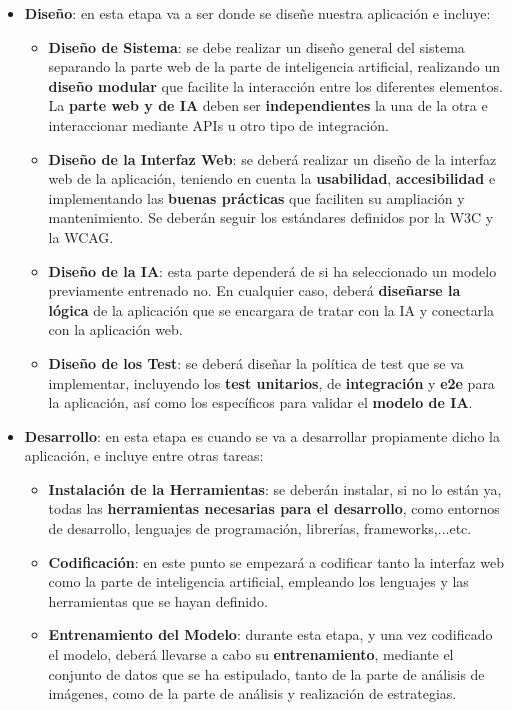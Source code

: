 \begin{itemize}
	\item \textbf{Diseño}: en esta etapa va a ser donde se diseñe nuestra aplicación e incluye:
	\begin{itemize}
		\item  \textbf{Diseño de Sistema}: se debe realizar un diseño general del sistema separando la parte web de la parte de inteligencia artificial, realizando un \textbf{diseño modular} que facilite la interacción entre los diferentes elementos. La \textbf{parte web y de IA} deben ser \textbf{independientes} la una de la otra e interaccionar mediante APIs u otro tipo de integración.
		\item \textbf{Diseño de la Interfaz Web}: se deberá realizar un diseño de la interfaz web de la aplicación, teniendo en cuenta la \textbf{\textbf{usabilidad}}, \textbf{accesibilidad} e implementando las \textbf{\textbf{buenas prácticas}} que faciliten su ampliación y mantenimiento. Se deberán seguir los estándares definidos por la W3C y la WCAG. 
		\item \textbf{Diseño de la IA}: esta parte dependerá de si ha seleccionado un modelo previamente entrenado no. En cualquier caso, deberá \textbf{diseñarse la lógica} de la aplicación que se encargara de tratar con la IA y conectarla con la aplicación web.
		\item \textbf{Diseño de los Test}: se deberá diseñar la política de test que se va implementar, incluyendo los \textbf{test unitarios}, de \textbf{integración} y \textbf{e2e} para la aplicación, así como los específicos para validar el \textbf{modelo de IA}.
	\end{itemize}
	
	\item \textbf{Desarrollo}: en esta etapa es cuando se va a desarrollar propiamente dicho la aplicación, e incluye entre otras tareas:
	\begin{itemize}
		\item \textbf{Instalación de la Herramientas}: se deberán instalar, si no lo están ya, todas las \textbf{herramientas necesarias para el desarrollo}, como entornos de desarrollo, lenguajes de programación, librerías, frameworks,...etc.
		\item \textbf{Codificación}: en este punto se empezará a codificar tanto la interfaz web como la parte de inteligencia artificial, empleando los lenguajes y las herramientas que se hayan definido.
		\item \textbf{Entrenamiento del Modelo}: durante esta etapa, y una vez codificado el modelo, deberá llevarse a cabo su \textbf{entrenamiento}, mediante el conjunto de datos que se ha estipulado, tanto de la parte de análisis de imágenes, como de la parte de análisis y realización de estrategias.
	\end{itemize}
	

\end{itemize}
